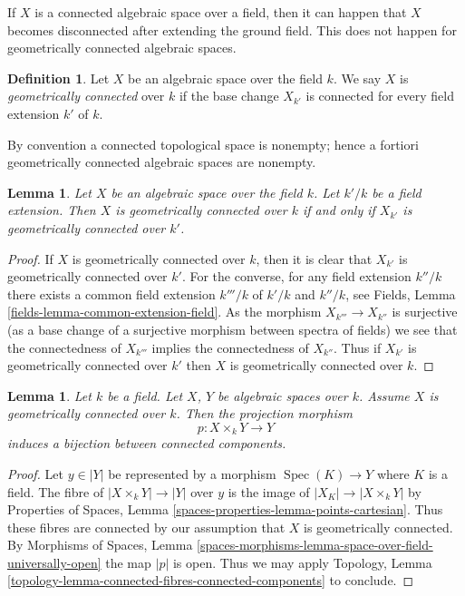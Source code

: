 \documentclass{stacks-project}
\theoremstyle{plain}
\newtheorem{lemma}[subsection]{Lemma}
\theoremstyle{definition}
\newtheorem{definition}[subsection]{Definition}
\theoremstyle{remark}
\numberwithin{equation}{subsection}
\def\Spec{\mathop{\mathrm{Spec}}}
\begin{document}
\noindent
If $X$ is a connected algebraic space over a field, then it can happen that
$X$ becomes disconnected after extending the ground field. This does not
happen for geometrically connected algebraic spaces.

\begin{definition}
\label{definition-geometrically-connected}
Let $X$ be an algebraic space over the field $k$. We say $X$ is
{\it geometrically connected} over $k$ if the base change $X_{k'}$
is connected for every field extension $k'$ of $k$.
\end{definition}

\noindent
By convention a connected topological space is nonempty; hence a fortiori
geometrically connected algebraic spaces are nonempty.

\begin{lemma}
\label{lemma-geometrically-connected-check-after-extension}
Let $X$ be an algebraic space over the field $k$.
Let $k'/k$ be a field extension.
Then $X$ is geometrically connected over $k$ if and only if
$X_{k'}$ is geometrically connected over $k'$.
\end{lemma}

\begin{proof}
If $X$ is geometrically connected over $k$, then it is clear that
$X_{k'}$ is geometrically connected over $k'$. For the converse,
for any field extension $k''/k$ there exists a common
field extension $k'''/k$ of $k'/k$ and $k''/k$, see
Fields, Lemma \ref{fields-lemma-common-extension-field}. As the
morphism $X_{k'''} \to X_{k''}$ is surjective (as a base change of
a surjective morphism between spectra of fields) we see that the
connectedness of $X_{k'''}$ implies the connectedness of $X_{k''}$.
Thus if $X_{k'}$ is geometrically connected over $k'$ then
$X$ is geometrically connected over $k$.
\end{proof}

\begin{lemma}
\label{lemma-bijection-connected-components}
Let $k$ be a field. Let $X$, $Y$ be algebraic spaces over $k$.
Assume $X$ is geometrically connected over $k$.
Then the projection morphism
$$
p : X \times_k Y \longrightarrow Y
$$
induces a bijection between connected components.
\end{lemma}

\begin{proof}
Let $y \in |Y|$ be represented by a morphism $\Spec(K) \to Y$
where $K$ is a field. The fibre of $|X \times_k Y| \to |Y|$ over $y$
is the image of $|X_K| \to |X \times_k Y|$ by
Properties of Spaces, Lemma \ref{spaces-properties-lemma-points-cartesian}.
Thus these fibres are connected by our assumption that $X$ is
geometrically connected. By
Morphisms of Spaces, Lemma
\ref{spaces-morphisms-lemma-space-over-field-universally-open}
the map $|p|$ is open.
Thus we may apply Topology,
Lemma \ref{topology-lemma-connected-fibres-connected-components}
to conclude.
\end{proof}
\end{document}
